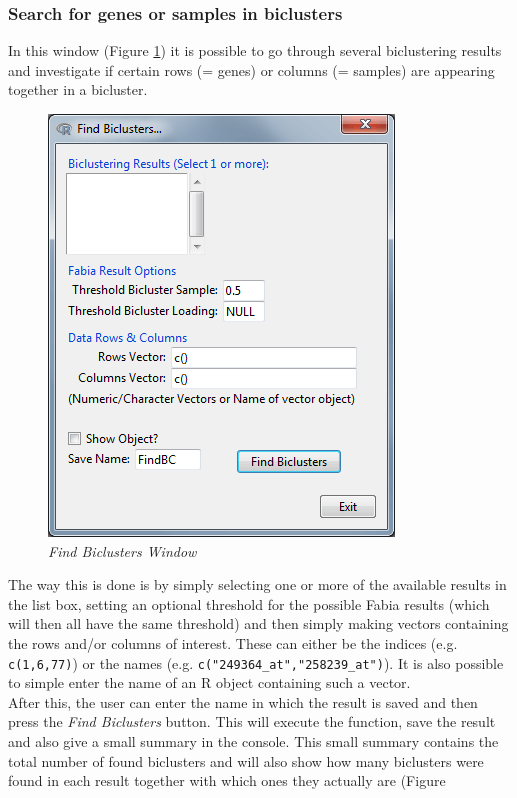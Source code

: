 \documentclass[a4paper]{article}\usepackage[]{graphicx}\usepackage[]{color}
\begin{document}
\subsubsection{Search for genes or samples in biclusters}

\noindent In this window (Figure \ref{findwindow}) it is possible to go through several
biclustering results and investigate if certain rows (= genes) or columns (= samples) are
appearing together in a bicluster. 
\begin{figure}[H]
\centering
\includegraphics[scale=0.5]{figures/findwindow.png}
\caption{{\it Find Biclusters Window}\label{findwindow}}
\end{figure}
\noindent The way this is done is by simply selecting
one or more of the available results in the list box, setting an optional
threshold for the possible Fabia results (which will then all have the same
threshold) and then simply making vectors containing the rows and/or columns of interest. These
can either be the indices (e.g. \verb|c(1,6,77)|) or the names (e.g.
\verb|c("249364_at","258239_at")|). It is also possible to simple enter the name
of an R object containing such a vector.\\
After this, the user can enter the name in which the result is saved and then
press the {\it Find Biclusters} button. This will execute the function, save the
result and also give a small summary in the console. This small summary contains
the total number of found biclusters and will also show how many biclusters were
found in each result together with which ones they actually are (Figure
\end{document}
